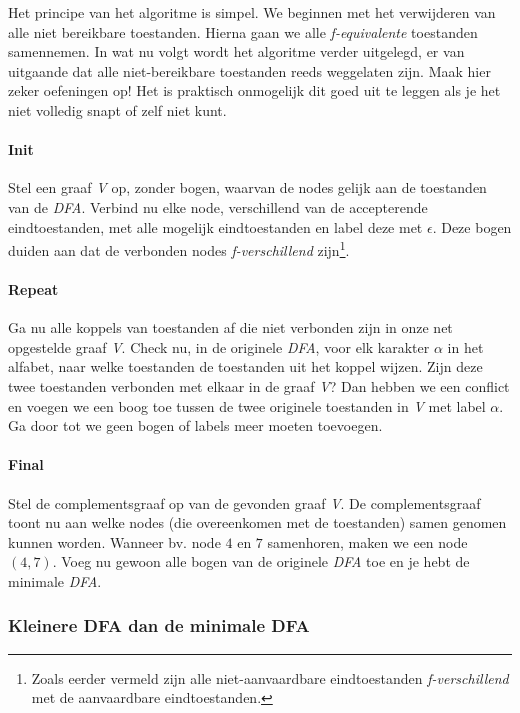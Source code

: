 Het principe van het algoritme is simpel. We beginnen met het verwijderen van alle niet bereikbare toestanden. Hierna gaan we alle \textit{f-equivalente} toestanden samennemen. In wat nu volgt wordt het algoritme verder uitgelegd, er van uitgaande dat alle niet-bereikbare toestanden reeds weggelaten zijn. Maak hier zeker oefeningen op! Het is praktisch onmogelijk dit goed uit te leggen als je het niet volledig snapt of zelf niet kunt.

\paragraph{Init} Stel een graaf \emph{V} op, zonder bogen, waarvan de nodes gelijk aan de toestanden van de \emph{DFA}. Verbind nu elke node, verschillend van de accepterende eindtoestanden, met alle mogelijk eindtoestanden en label deze met $\epsilon$. Deze bogen duiden aan dat de verbonden nodes \emph{f-verschillend} zijn\footnote{Zoals eerder vermeld zijn alle niet-aanvaardbare eindtoestanden \emph{f-verschillend} met de aanvaardbare eindtoestanden.}.

\paragraph{Repeat} Ga nu alle koppels van toestanden af die niet verbonden zijn in onze net opgestelde graaf \emph{V}. Check nu, in de originele \emph{DFA}, voor elk karakter $\alpha$ in het alfabet, naar welke toestanden de toestanden uit het koppel wijzen. Zijn deze twee toestanden verbonden met elkaar in de graaf \emph{V}? Dan hebben we een conflict en voegen we een boog toe tussen de twee originele toestanden in \emph{V} met label $\alpha$. Ga door tot we geen bogen of labels meer moeten toevoegen.

\paragraph{Final} Stel de complementsgraaf op van de gevonden graaf \emph{V}. De complementsgraaf toont nu aan welke nodes (die overeenkomen met de toestanden) samen genomen kunnen worden. Wanneer bv. node $4$ en $7$ samenhoren, maken we een node $(4,7)$. Voeg nu gewoon alle bogen van de originele \emph{DFA} toe en je hebt de minimale \emph{DFA}.

\subsubsection*{Kleinere DFA dan de minimale DFA}

